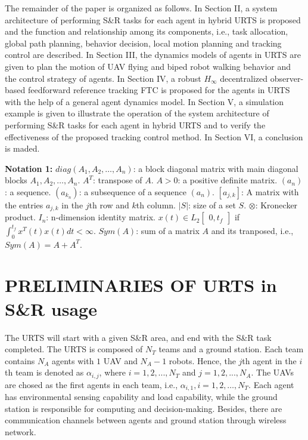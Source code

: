 \documentclass[journal,12pt,onecolumn,draftclsnofoot,]{IEEEtran}
\begin{document}
The remainder of the paper is organized as follows. In Section II, a system architecture of performing S\&R tasks for each agent in hybrid URTS is proposed and the function and relationship among its components, i.e., task allocation, global path planning, behavior decision, local motion planning and tracking control are described. In Section III, the dynamics models of agents in URTS are given to plan the motion of UAV flying and biped robot walking behavior and the control strategy of agents. In Section IV, a robust $H_\infty$ decentralized observer-based feedforward reference tracking FTC is proposed for the agents in URTS with the help of a general agent dynamics model. In Section V, a simulation example is given to illustrate the operation of the system architecture of performing S\&R tasks for each agent in hybrid URTS and to verify the effectiveness of the proposed tracking control method. In Section VI, a conclusion is maded.

\textbf{Notation 1:} 
$diag(A_1, A_2, \dots, A_n)$: a block diagonal matrix with main diagonal blocks $A_1, A_2, \dots, A_n$. $A^T$: transpose of $A$. $A > 0$: a positive definite matrix. $(a_n)$: a sequence. $(a_{k_n})$: a subsequence of a sequence $(a_n)$. $[a_{j,k}]$: A matrix with the entries $a_{j,k}$ in the $j$th row and $k$th column. $\vert{S}\vert$: size of a set $S$. $\otimes$: Kronecker product. $I_n$: n-dimension identity matrix. $x(t)\in L_2\begin{bmatrix}
    0,t_f 
\end{bmatrix}$ if $\int^{t_f}_{0}x^T(t)x(t)dt<\infty$. $Sym(A)$: sum of a matrix $A$ and its tranposed, i.e., $Sym(A) = A+A^T$.

\section{PRELIMINARIES OF URTS in S\&R usage}
The URTS will start with a given S\&R area, and end with the S\&R task completed. The URTS is composed of $N_T$ teams and a ground station. Each team contains $N_A$ agents with $1$ UAV and $N_A-1$ robots. Hence, the $j$th agent in the $i$th team is denoted as $\alpha_{i,j}$, where $i=1,2,...,N_T$ and $j=1,2,...,N_A$. The UAVs are chosed as the first agents in each team, i.e., $\alpha_{i,1},i=1,2,\dots,N_T$. Each agent has environmental sensing capability and load capability, while the ground station is responsible for computing and decision-making. Besides, there are communication channels between agents and ground station through wireless network.
\end{document}
